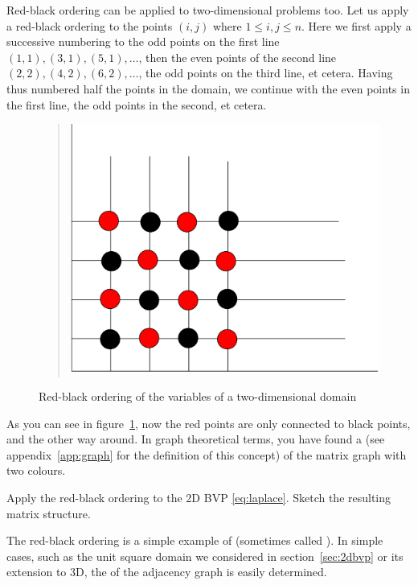 Red-black ordering can be applied to two-dimensional problems too.
Let us apply a red-black ordering to the points $(i,j)$ where $1\leq
i,j\leq n$.
Here we first apply a successive numbering to the odd
points on the first line $(1,1),(3,1),(5,1),\ldots$, then the even
points of the second line $(2,2),(4,2),(6,2),\ldots$, the odd points
on the third line, et cetera. Having thus numbered half the points in
the domain, we continue with the even points in the first line, the
odd points in the second, et cetera.
\begin{figure}[ht]
  \begin{quote}
    \includegraphics[scale=.12]{graphics-public/redblack}
  \end{quote}
  \caption{Red-black ordering of the variables of a two-dimensional
    domain}
  \label{fig:redblack}
\end{figure}
As you can see in figure~\ref{fig:redblack}, now the red points are
only connected to black points, and the other way around. In graph
theoretical terms, you have found a  
(see appendix~\ref{app:graph} for the definition
of this concept) of the matrix graph with two colours.

\begin{exercise}
  Apply the red-black ordering to the 2D \ac{BVP} \eqref{eq:laplace}.
  Sketch the resulting matrix structure.
\end{exercise}

The red-black ordering is a simple
example of  (sometimes called
). In
simple cases, such as the unit square domain we considered in
section~\ref{sec:2dbvp} or its extension to 3D, the  of the adjacency graph is easily determined.

